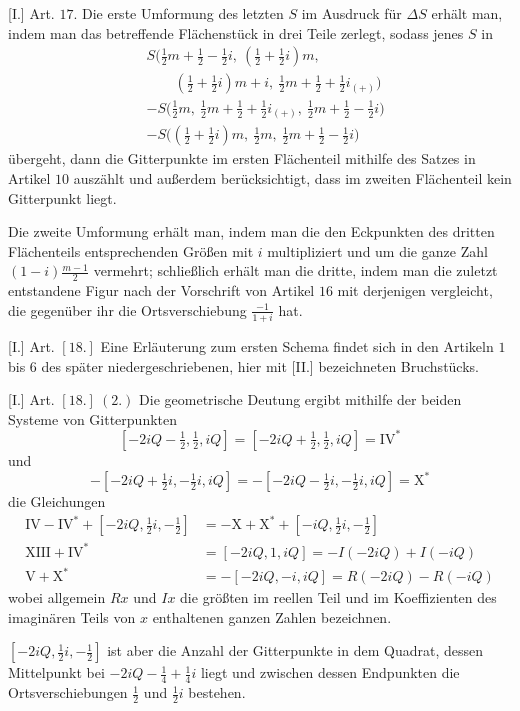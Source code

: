 [I.] Art. $17$. Die erste Umformung des letzten $S$ im Ausdruck für $\Delta S$ erhält man, indem man das betreffende Flächenstück in drei Teile zerlegt, sodass jenes $S$ in
\[
\begin{aligned}
&S\bigl(\tfrac12m+\tfrac12-\tfrac12i,\ (\tfrac12+\tfrac12i)m,\\
&\qquad(\tfrac12+\tfrac12i)m+i,\ \tfrac12m+\tfrac12+\tfrac12i_{(+)}\bigr)\\
&-S\bigl(\tfrac12m,\ \tfrac12m+\tfrac12+\tfrac12i_{(+)},\ \tfrac12m+\tfrac12-\tfrac12i\bigr)\\
&-S\bigl((\tfrac12+\tfrac12i)m,\ \tfrac12m,\ \tfrac12m+\tfrac12-\tfrac12i\bigr)
\end{aligned}
\]
übergeht, dann die Gitterpunkte im ersten Flächenteil mithilfe des Satzes in Artikel $10$ auszählt und außerdem berücksichtigt, dass im zweiten Flächenteil kein Gitterpunkt liegt.

Die zweite Umformung erhält man, indem man die den Eckpunkten des dritten Flächenteils entsprechenden Größen mit $i$ multipliziert und um die ganze Zahl $(1-i)\frac{m-1}{2}$ vermehrt; schließlich erhält man die dritte, indem man die zuletzt entstandene Figur nach der Vorschrift von Artikel $16$ mit derjenigen vergleicht, die gegenüber ihr die Ortsverschiebung $\frac{-1}{1+i}$ hat.

[I.] Art. $[18.]$ Eine Erläuterung zum ersten Schema findet sich in den Artikeln $1$ bis $6$ des später niedergeschriebenen, hier mit [II.] bezeichneten Bruchstücks.

[I.] Art. $[18.]\ (2.)$ Die geometrische Deutung ergibt mithilfe der beiden Systeme von Gitterpunkten
\[
[-2iQ-\tfrac12,\tfrac12,iQ]=[-2iQ+\tfrac12,\tfrac12,iQ]=\mathrm{IV}^{*}
\]
und
\[
-[-2iQ+\tfrac12i,-\tfrac12i,iQ]=-[-2iQ-\tfrac12i,-\tfrac12i,iQ]=\mathrm{X}^{*}
\]
die Gleichungen
\[
\begin{aligned}
\mathrm{IV}-\mathrm{IV}^{*}+[-2iQ,\tfrac12i,-\tfrac12]
&=-\mathrm{X}+\mathrm{X}^{*}+[-iQ,\tfrac12i,-\tfrac12]\\
\mathrm{XIII}+\mathrm{IV}^{*}&=[-2iQ,1,iQ]=-I(-2iQ)+I(-iQ)\\
\mathrm{V}+\mathrm{X}^{*}&=-[-2iQ,-i,iQ]=R(-2iQ)-R(-iQ)
\end{aligned}
\]
wobei allgemein $Rx$ und $Ix$ die größten im reellen Teil und im Koeffizienten des imaginären Teils von $x$ enthaltenen ganzen Zahlen bezeichnen.

$[-2iQ,\tfrac12i,-\tfrac12]$ ist aber die Anzahl der Gitterpunkte in dem Quadrat, dessen Mittelpunkt bei $-2iQ-\tfrac14+\tfrac14i$ liegt und zwischen dessen Endpunkten die Ortsverschiebungen $\tfrac12$ und $\tfrac12i$ bestehen.

